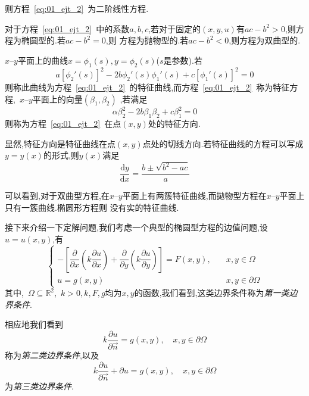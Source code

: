 \documentclass[a4paper,cs4size,adobefonts,fancyhdr]{ctexart}[2005/11/25]
\newcommand{\dif}{\mathrm{d}}
\begin{document}
则方程~\eqref{eq:01_ejt_2}~为二阶线性方程.\par
对于方程~\eqref{eq:01_ejt_2}~中的系数$a,b,c$,若对于固定的$(x,y,u)$有$ac-b^2>0$,则方程为椭圆型的.若$ac-b^2=0$,则
方程为抛物型的.若$ac-b^2<0$,则方程为双曲型的.\par
$x$--$y$平面上的曲线$x=\phi_1(s),y=\phi_2(s)$($s$是参数).若
\begin{equation}
 a[\phi_2'(s)]^2-2b\phi_2'(s)\phi_1'(s)+c[\phi_1'(s)]^2=0
\end{equation}
则称此曲线为方程~\eqref{eq:01_ejt_2}~的特征曲线,而方程~\eqref{eq:01_ejt_2}~称为特征方程,~$x$--$y$平面上的向量$(\beta_1,\beta_2)$
,若满足
\begin{equation}
 \alpha\beta_2^2-2b\beta_1\beta_2+c\beta_1^2=0
\end{equation}
则称为方程~\eqref{eq:01_ejt_2}~在点$(x,y)$处的特征方向.\par
显然,特征方向是特征曲线在点$(x,y)$点处的切线方向.若特征曲线的方程可以写成$y=y(x)$的形式,则$y(x)$满足
\begin{equation}
 \dfrac{\dif y}{\dif x}=\dfrac{b\pm\sqrt{b^2-ac}}{a}
\end{equation}\par
可以看到,对于双曲型方程,在$x$--$y$平面上有两簇特征曲线,而拋物型方程在$x$--$y$平面上只有一簇曲线.椭圆形方程则
没有实的特征曲线.\par
接下来介绍一下定解问题,我们考虑一个典型的椭圆型方程的边值问题,设$u=u(x,y)$,有
\begin{equation}
 \begin{cases}
  -\left[\dfrac{\partial}{\partial x}\left(k\dfrac{\partial u}{\partial x}\right)+
  \dfrac{\partial}{\partial y}\left(k\dfrac{\partial u}{\partial y}\right)\right]=F(x,y)
  ,&	\quad x,y \in \Omega \\[1em]
  u=g(x,y)	& \quad	x,y\in \partial \Omega
 \end{cases}
\end{equation}
其中,~$\Omega\subseteq\mathbb{R}^2$,~$k>0,k,F,g$均为$x,y$的函数,我们看到,这类边界条件称为\emph{第一类边界条件}.\par
相应地我们看到
\begin{equation}
 k\dfrac{\partial u}{\partial \vec{n}}=g(x,y),\quad x,y\in\partial\Omega
\end{equation}
称为\emph{第二类边界条件},以及
\begin{equation}
 k\dfrac{\partial u}{\partial \vec{n}}+\partial u=g(x,y),\quad x,y\in\partial\Omega
\end{equation}
为\emph{第三类边界条件}.
\end{document}
